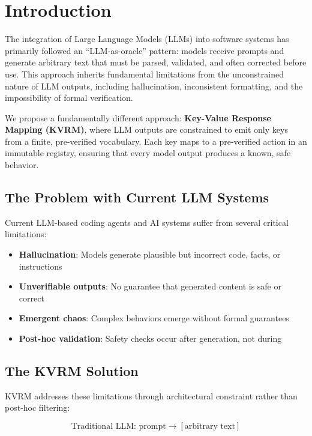 \documentclass[11pt,a4paper]{article}
\begin{document}
\section{Introduction}
\label{sec:introduction}

The integration of Large Language Models (LLMs) into software systems has primarily followed an ``LLM-as-oracle'' pattern: models receive prompts and generate arbitrary text that must be parsed, validated, and often corrected before use. This approach inherits fundamental limitations from the unconstrained nature of LLM outputs, including hallucination, inconsistent formatting, and the impossibility of formal verification.

We propose a fundamentally different approach: \textbf{Key-Value Response Mapping (KVRM)}, where LLM outputs are constrained to emit only keys from a finite, pre-verified vocabulary. Each key maps to a pre-verified action in an immutable registry, ensuring that every model output produces a known, safe behavior.

\subsection{The Problem with Current LLM Systems}

Current LLM-based coding agents and AI systems suffer from several critical limitations:

\begin{itemize}
    \item \textbf{Hallucination}: Models generate plausible but incorrect code, facts, or instructions
    \item \textbf{Unverifiable outputs}: No guarantee that generated content is safe or correct
    \item \textbf{Emergent chaos}: Complex behaviors emerge without formal guarantees
    \item \textbf{Post-hoc validation}: Safety checks occur after generation, not during
\end{itemize}

\subsection{The KVRM Solution}

KVRM addresses these limitations through architectural constraint rather than post-hoc filtering:

\begin{equation}
\text{Traditional LLM: } \text{prompt} \rightarrow [\text{arbitrary text}]
\end{equation}
\end{document}
